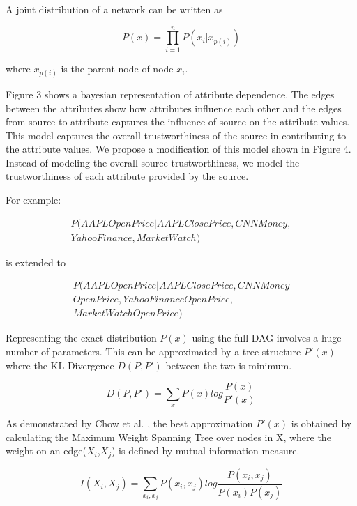 \documentclass{acm_proc_article-sp}
\begin{document}
A joint distribution of a network can be written as 

\begin{equation}
P(x) = \prod_{i=1}^n P(x_i|x_{p(i)})
\end{equation}

where $x_{p(i)}$ is the parent node of node $x_i$.

Figure 3 shows a bayesian representation of attribute dependence. The edges between the attributes show how attributes influence each other and the edges from source to attribute captures the influence of source on the attribute values. This model captures the overall trustworthiness of the source in contributing to the attribute values.  We propose a modification of this model shown in Figure 4. Instead of modeling the overall source trustworthiness, we model the trustworthiness of each attribute provided by the source. 

For example:


\begin{align}
P(AAPL Open Price|AAPL Close Price, CNN Money,\nonumber  
\\Yahoo Finance, Market Watch) 
\end{align}

is extended to 

\begin{align}
P(AAPL Open Price|AAPL Close Price, CNN Money \nonumber  
\\Open Price,Yahoo Finance Open Price, \nonumber  
\\Market Watch Open Price) 
\end{align}

Representing the exact distribution $P(x)$ using the full DAG involves a huge number of parameters. This can be approximated by a tree structure $P'(x)$ where the KL-Divergence $D(P,P')$ between the two is minimum.  

\begin{equation}
D(P,P') = \sum_x P(x) log \frac{P(x)}{P'(x)}
\end{equation}

As demonstrated by Chow et al. \cite{chow1968approximating}, the best approximation $P'(x)$ is obtained by calculating the Maximum Weight Spanning Tree over nodes in X, where the weight on an edge($X_i$,$X_j$) is  defined by mutual information measure. 

\begin{equation}
I(X_i,X_j) = \sum_{x_i,x_j} P(x_i,x_j) log\frac{P(x_i,x_j)}{P(x_i) P(x_j)}
\end{equation}
\end{document}
